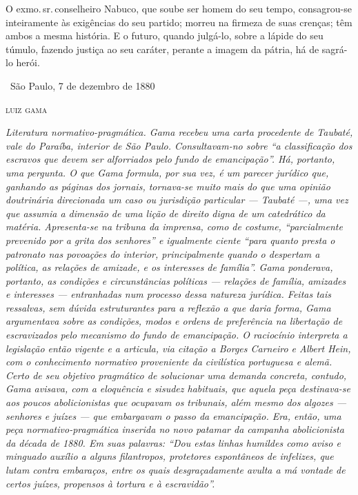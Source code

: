 O exmo.\,sr.\,conselheiro Nabuco, que soube ser homem do seu tempo,
consagrou-se inteiramente às exigências do seu partido; morreu na
firmeza de suas crenças; têm ambos a mesma história. E o futuro, quando
julgá-lo, sobre a lápide do seu túmulo, fazendo justiça ao seu caráter,
perante a imagem da pátria, há de sagrá-lo herói.

\medskip

\hfill\ São Paulo, 7 de dezembro de 1880

\hfill\textsc{luiz gama}


\begin{resumo}
\emph{Literatura normativo-pragmática. Gama recebeu uma carta procedente
de Taubaté, vale do Paraíba, interior de São Paulo. Consultavam-no sobre
``a classificação dos escravos que devem ser alforriados pelo fundo de
emancipação''. Há, portanto, uma pergunta. O que Gama formula, por sua
vez, é um parecer jurídico que, ganhando as páginas dos jornais,
tornava-se muito mais do que uma opinião doutrinária direcionada um caso
ou jurisdição particular --- Taubaté ---, uma vez que assumia a dimensão
de uma lição de direito digna de um catedrático da matéria. Apresenta-se
na tribuna da imprensa, como de costume, ``parcialmente prevenido por a
grita dos senhores'' e igualmente ciente ``para quanto presta o patronato
nas povoações do interior, principalmente quando o despertam a política,
as relações de amizade, e os interesses de família''. Gama ponderava,
portanto, as condições e circunstâncias políticas --- relações de
família, amizades e interesses --- entranhadas num processo dessa
natureza jurídica. Feitas tais ressalvas, sem dúvida estruturantes para
a reflexão a que daria forma, Gama argumentava sobre as condições, modos
e ordens de preferência na libertação de escravizados pelo mecanismo do
fundo de emancipação. O raciocínio interpreta a legislação então vigente
e a articula, via citação a Borges Carneiro e Albert Hein, com o
conhecimento normativo proveniente da civilística portuguesa e alemã.
Certo de seu objetivo pragmático de solucionar uma demanda concreta,
contudo, Gama avisava, com a eloquência e sisudez habituais, que aquela
peça destinava-se aos poucos abolicionistas que ocupavam os tribunais,
além mesmo dos algozes --- senhores e juízes --- que embargavam o passo da
emancipação. Era, então, uma peça normativo-pragmática inserida no novo
patamar da campanha abolicionista da década de 1880. Em suas palavras:
``Dou estas linhas humildes como aviso e minguado auxílio a alguns
filantropos, protetores espontâneos de infelizes, que lutam contra
embaraços, entre os quais desgraçadamente avulta a má vontade de certos
juízes, propensos à tortura e à escravidão''.}
\end{resumo}

